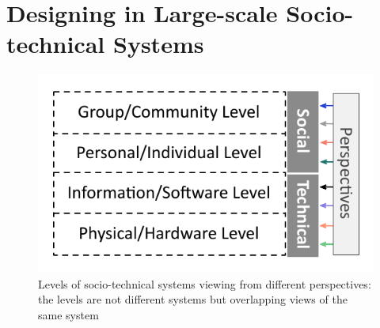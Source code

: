 \section{Designing in Large-scale Socio-technical Systems}
\label{sec:design}



\begin{figure}[t]
\sidecaption[t]
\includegraphics[scale=.65]{img/sts_levels.pdf}
\caption{Levels of socio-technical systems viewing from different perspectives: the levels are not different systems but overlapping views of the same system \cite{Whitworth2009,Whitworth2013}}
\label{fig:sts_levels} 
\end{figure}

